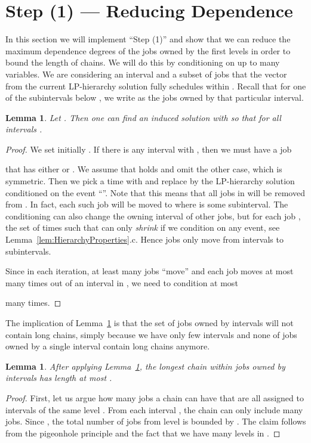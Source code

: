 \documentclass[11pt,letterpaper,oneside,english]{article}
\theoremstyle{theorem}
\newtheorem{lemma}[theorem]{Lemma}
\begin{document}
\section{Step (1) --- Reducing Dependence} \label{sec:ReducingDependence}


In this section we will implement ``Step (1)'' and show that we can reduce the maximum dependence degrees of 
the jobs owned by the first  levels in order to bound the length of chains. 
We will do this by conditioning on up to
 many variables.
We are considering an interval  and 
a subset of jobs  that the vector  from the current LP-hierarchy solution  fully
schedules within . Recall that for one of the subintervals  
below , we write 
as the jobs owned by that particular interval.
\begin{lemma} \label{lem:BreakingChains}
Let .
Then one can find an induced solution 
with 
so that  for all
intervals .
\end{lemma}
\begin{proof}
We set initially . If there is any interval  with
, then we must have a job

that has either  or 
. We assume that 
 holds and omit the other case, which is symmetric.
Then we pick a time  with  and
 replace  by the LP-hierarchy solution conditioned on the
event ``''. Note that this
means that all jobs in  will be removed
from . In fact, each such job will be moved to  where 
is some subinterval. The conditioning can also change the owning interval of
other jobs, but for each job , the set  of times  such that 
can only \emph{shrink} if we condition on
any event, see Lemma~\ref{lem:HierarchyProperties}.c. 
Hence jobs only move from intervals to subintervals. 


Since in each iteration, at least  many
jobs ``move'' and each job moves at most 
 many
times out of an interval
in , we need to condition at most 

many times.
\end{proof}


The implication of Lemma~\ref{lem:BreakingChains} is that the set of jobs owned by
intervals  will not contain long chains,
simply because we have only few intervals and none of jobs owned
by a single interval contain long chains anymore.
\begin{lemma} \label{lem:BoundedChains}
After applying Lemma~\ref{lem:BreakingChains}, the longest chain within
jobs owned by intervals 
has length at most .
\end{lemma}
\begin{proof}
First, let us argue how many jobs a chain can have that are all assigned
to intervals of the same level
. From each interval , the chain can only include  many jobs.
Since , the total number of jobs from
level  is bounded by .
The claim follows from the pigeonhole principle and the fact that we have 
many levels in .
\end{proof}
\end{document}

